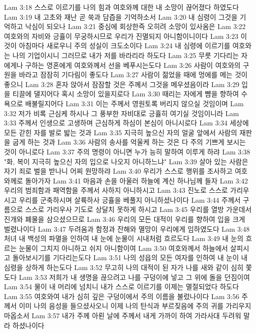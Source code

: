 Lam 3:18  스스로 이르기를 나의 힘과 여호와께 대한 내 소망이 끊어졌다 하였도다
Lam 3:19  내 고초와 재난 곧 쑥과 담즙을 기억하소서
Lam 3:20  내 심령이 그것을 기억하고 낙심이 되오나
Lam 3:21  중심에 회상한즉 오히려 소망이 있사옴은
Lam 3:22  여호와의 자비와 긍휼이 무궁하시므로 우리가 진멸되지 아니함이니이다
Lam 3:23  이것이 아침마다 새로우니 주의 성실이 크도소이다
Lam 3:24  내 심령에 이르기를 여호와는 나의 기업이시니 그러므로 내가 저를 바라리라 하도다
Lam 3:25  무릇 기다리는 자에게나 구하는 영혼에게 여호와께서 선을 베푸시는도다
Lam 3:26  사람이 여호와의 구원을 바라고 잠잠히 기다림이 좋도다
Lam 3:27  사람이 젊었을 때에 멍에를 메는 것이 좋으니
Lam 3:28  혼자 앉아서 잠잠할 것은 주께서 그것을 메우셨음이라
Lam 3:29  입을 티끌에 댈지어다 혹시 소망이 있을지로다
Lam 3:30  때리는 자에게 뺨을 향하여 수욕으로 배불릴지어다
Lam 3:31  이는 주께서 영원토록 버리지 않으실 것임이며
Lam 3:32  저가 비록 근심케 하시나 그 풍부한 자비대로 긍휼히 여기실 것임이니라
Lam 3:33  주께서 인생으로 고생하며 근심하게 하심이 본심이 아니시로다
Lam 3:34  세상에 모든 갇힌 자를 발로 밟는 것과
Lam 3:35  지극히 높으신 자의 얼굴 앞에서 사람의 재판을 굽게 하는 것과
Lam 3:36  사람의 송사를 억울케 하는 것은 다 주의 기쁘게 보시는 것이 아니로다
Lam 3:37  주의 명령이 아니면 누가 능히 말하여 이루게 하랴
Lam 3:38  "화, 복이 지극히 높으신 자의 입으로 나오지 아니하느냐"
Lam 3:39  살아 있는 사람은 자기 죄로 벌을 받나니 어찌 원망하랴
Lam 3:40  우리가 스스로 행위를 조사하고 여호와께로 돌아가자
Lam 3:41  마음과 손을 아울러 하늘에 계신 하나님께 들자
Lam 3:42  우리의 범죄함과 패역함을 주께서 사하지 아니하시고
Lam 3:43  진노로 스스로 가리우시고 우리를 군축하시며 살륙하사 긍휼을 베풀지 아니하셨나이다
Lam 3:44  주께서 구름으로 스스로 가리우사 기도로 상달치 못하게 하시고
Lam 3:45  우리를 열방 가운데서 진개와 폐물을 삼으셨으므로
Lam 3:46  우리의 모든 대적이 우리를 향하여 입을 크게 벌렸나이다
Lam 3:47  두려움과 함정과 잔해와 멸망이 우리에게 임하였도다
Lam 3:48  처녀 내 백성의 파멸을 인하여 내 눈에 눈물이 시내처럼 흐르도다
Lam 3:49  내 눈의 흐르는 눈물이 그치지 아니하고 쉬지 아니함이여
Lam 3:50  여호와께서 하늘에서 살피시고 돌아보시기를 기다리는도다
Lam 3:51  나의 성읍의 모든 여자를 인하여 내 눈이 내 심령을 상하게 하는도다
Lam 3:52  무고히 나의 대적이 된 자가 나를 새와 같이 심히 쫓도다
Lam 3:53  저희가 내 생명을 끊으려고 나를 구덩이에 넣고 그 위에 돌을 던짐이여
Lam 3:54  물이 내 머리에 넘치니 내가 스스로 이르기를 이제는 멸절되었다 하도다
Lam 3:55  여호와여 내가 심히 깊은 구덩이에서 주의 이름을 불렀나이다
Lam 3:56  주께서 이미 나의 음성을 들으셨사오니 이제 나의 탄식과 부르짖음에 주의 귀를 가리우지 마옵소서
Lam 3:57  내가 주께 아뢴 날에 주께서 내게 가까이 하여 가라사대 두려워 말라 하셨나이다

